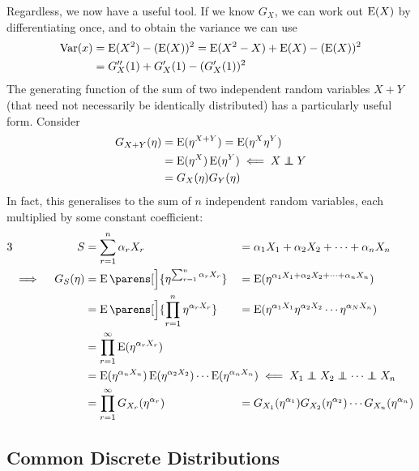 Regardless, we now have a useful tool. If we know \(G_X\), we can work out
\(\operatorname{E}(X)\) by differentiating once, and to obtain the variance we can use
\begin{align*}
 \operatorname{Var}(x) &= \operatorname{E}(X^2) - (\operatorname{E}(X))^2
     = \operatorname{E}(X^2 - X) + \operatorname{E}(X) - (\operatorname{E}(X))^2 \\
     &= G_X''(1) + G_X'(1) - (G_X'(1))^2
\end{align*}
The generating function of the sum of two independent random variables \(X + Y\)
(that need not necessarily be identically distributed) has a particularly useful
form. Consider
\begin{align*}
 G_{X+Y}(\eta) &= \Expect(\eta^{X + Y}) = \Expect(\eta^X \eta^Y) \\
     &= \Expect(\eta^X) \Expect(\eta^Y) \impliedby X \independent Y \\
     &= G_X(\eta) G_Y(\eta)
\end{align*}
In fact, this generalises to the sum of \(n\) independent random variables, each
multiplied by some constant coefficient:
\begin{alignat*} 3
 && S &= \sum_{r = 1}^n \alpha_r X_r
 &&= \alpha_1 X_1 + \alpha_2 X_2 + \dotsb + \alpha_n X_n \\
 &\implies{}& G_S(\eta)
     &= \Expect\parens[\Big]{\eta^{\sum_{r = 1}^n \alpha_r X_r}}
 &&= \Expect(\eta^{\alpha_1 X_1 + \alpha_2 X_2 + \dotsb + \alpha_n X_n}) \\
 && &= \Expect\parens[\Big]{\prod_{r = 1}^n \eta^{\alpha_r X_r}}
 &&= \Expect(\eta^{\alpha_1 X_1} \eta^{\alpha_2 X_2} \dotsm
           \eta^{\alpha_N X_n}) \\
 && &= \prod_{r = 1}^\infty\Expect(\eta^{\alpha_r X_r}) \\
 && &= \mathrlap{
     \Expect(\eta^{\alpha_n X_n}) \Expect(\eta^{\alpha_2 X_2}) \dotsm
     \Expect(\eta^{\alpha_n X_n})
         \impliedby X_1 \independent X_2 \independent
                          \dotsb \independent X_n} \\
 && &= \prod_{r = 1}^\infty G_{X_r}(\eta^{\alpha_r})
 &&= G_{X_1}(\eta^{\alpha_1}) G_{X_2}(\eta^{\alpha_2}) \dotsm
     G_{X_n}(\eta^{\alpha_n})
\end{alignat*}

\subsection{Common Discrete Distributions}

